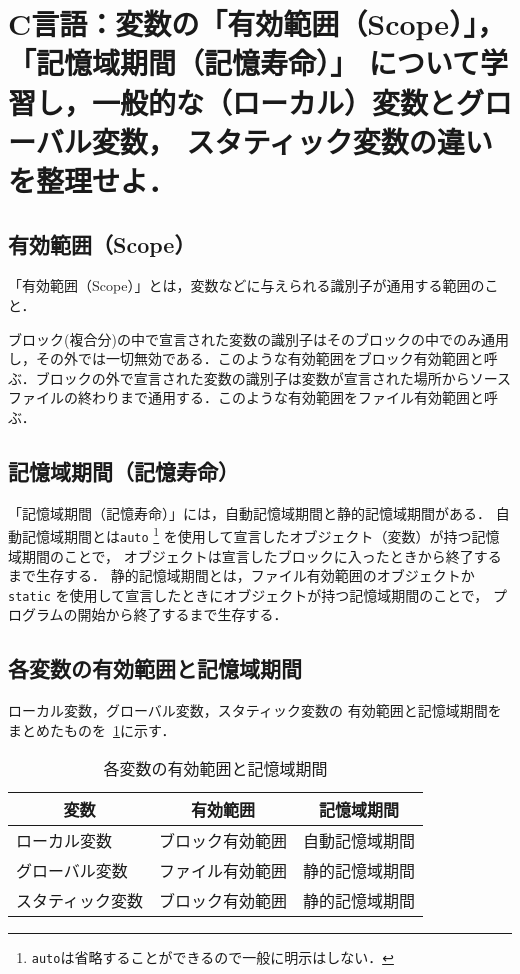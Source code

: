 \documentclass[a4paper, 10pt]{ltjsarticle}
\newcommand{\question}[1]{\section{#1}}
\newcommand{\subquestion}[1]{\subsection{#1}}
\newcommand{\Tblref}[1]{\tablename~\ref{#1}}
\begin{document}

\question{
	\textsf{C言語：}変数の「有効範囲（Scope）」，「記憶域期間（記憶寿命）」
	について学習し，一般的な（ローカル）変数とグローバル変数，
	スタティック変数の違いを整理せよ．\\
}

\vspace{-\baselineskip}


\subquestion{有効範囲（Scope）}

「有効範囲（Scope）」とは，変数などに与えられる識別子が通用する範囲のこと．

ブロック(複合分)の中で宣言された変数の識別子はそのブロックの中でのみ通用し，その外では一切無効である．このような有効範囲をブロック有効範囲と呼ぶ．ブロックの外で宣言された変数の識別子は変数が宣言された場所からソースファイルの終わりまで通用する．このような有効範囲をファイル有効範囲と呼ぶ．
\cite{isl}


\subquestion{記憶域期間（記憶寿命）}

「記憶域期間（記憶寿命）」には，自動記憶域期間と静的記憶域期間がある．
自動記憶域期間とは\texttt{auto}
\footnote{\texttt{auto}は省略することができるので一般に明示はしない．}
を使用して宣言したオブジェクト（変数）が持つ記憶域期間のことで，
オブジェクトは宣言したブロックに入ったときから終了するまで生存する．
静的記憶域期間とは，ファイル有効範囲のオブジェクトか\texttt{static}
を使用して宣言したときにオブジェクトが持つ記憶域期間のことで，
プログラムの開始から終了するまで生存する．\cite{atmarkit}

\pagebreak

\subquestion{各変数の有効範囲と記憶域期間}

ローカル変数，グローバル変数，スタティック変数の
有効範囲と記憶域期間をまとめたものを\Tblref{tbl:variable}に示す．
\begin{table}[htb]
	\centering
	\caption{各変数の有効範囲と記憶域期間}
	\begin{tabular}{l|c|c} \hline\hline
		\multicolumn{1}{c|}{変数} & 有効範囲 & 記憶域期間 \\ \hline
		ローカル変数     & ブロック有効範囲 & 自動記憶域期間 \\
		グローバル変数   & ファイル有効範囲 & 静的記憶域期間 \\
		スタティック変数 & ブロック有効範囲 & 静的記憶域期間 \\ \hline
	\end{tabular}
	\label{tbl:variable}
\end{table}
\end{document}
